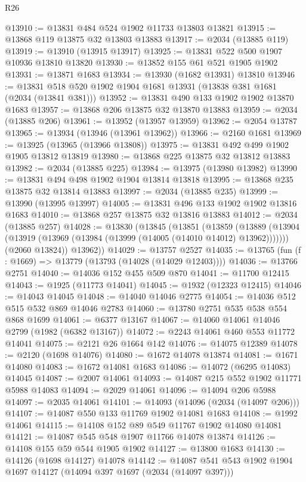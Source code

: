 \begin{lexlean}{R26}
\begin{coremodule}
@13910 := @13831 @484 @524 @1902 @11733 @13803 @13821
@13915 := @13868 @119 @13875 @32 @13803 @13883
@13917 := @2034 (@13885 @119)
@13919 := @13910 (@13915 @13917)
@13925 := @13831 @522 @500 @1907 @10936 @13810 @13820
@13930 := @13852 @155 @61 @521 @1905 @1902
@13931 := @13871 @1683
@13934 := @13930 (@1682 @13931) @13810
@13946 := @13831 @518 @520 @1902 @1904 @1681 @13931 (@13838 @381 @1681 (@2034 (@13841 @381)))
@13952 := @13831 @490 @133 @1902 @1902 @13870 @1683
@13957 := @13868 @206 @13875 @32 @13870 @13883
@13959 := @2034 (@13885 @206)
@13961 := @13952 (@13957 @13959)
@13962 := @2054 @13787
@13965 := @13934 (@13946 (@13961 @13962))
@13966 := @2160 @1681
@13969 := @13925 (@13965 (@13966 @13808))
@13975 := @13831 @492 @499 @1902 @1905 @13812 @13819
@13980 := @13868 @225 @13875 @32 @13812 @13883
@13982 := @2034 (@13885 @225)
@13984 := @13975 (@13980 @13982)
@13990 := @13831 @494 @498 @1902 @1904 @13814 @13818
@13995 := @13868 @235 @13875 @32 @13814 @13883
@13997 := @2034 (@13885 @235)
@13999 := @13990 (@13995 @13997)
@14005 := @13831 @496 @133 @1902 @1902 @13816 @1683
@14010 := @13868 @257 @13875 @32 @13816 @13883
@14012 := @2034 (@13885 @257)
@14028 := @13830
    (@13845
      (@13851
        (@13859
          (@13889 (@13904 (@13919 (@13969 (@13984 (@13999 (@14005 (@14010 @14012) @13962)))))))
          (@2060 @13824))
        @13962))
@14029 := @13757 @2527
@14035 := @13765 (fun (f : @1669) => @13779 (@13793 (@14028 (@14029 @12403))))
@14036 := @13766 @2751
@14040 := @14036 @152 @455 @509 @870
@14041 := @11700 @12415
@14043 := @1925 (@11773 @14041)
@14045 := @1932 (@12323 @12415)
@14046 := @14043 @14045
@14048 := @14040 @14046 @2775
@14054 := @14036 @512 @515 @532 @869 @14046 @2783
@14060 := @13780 @2751 @535 @538 @554 @868 @1699
@14061 := @6377 @13167
@14067 := @14060 @14061 @14046 @2799 (@1982 (@6382 @13167))
@14072 := @2243 @14061 @460 @553 @11772 @14041
@14075 := @2121 @26 @1664 @142
@14076 := @14075 @12389
@14078 := @2120 (@1698 @14076)
@14080 := @1672 @14078 @13874
@14081 := @1671 @14080
@14083 := @1672 @14081 @1683
@14086 := @14072 (@6295 @14083) @14045
@14087 := @2007 @14061
@14093 := @14087 @215 @552 @1902 @11771 @5988 @14083
@14094 := @2029 @14061
@14096 := @14094 @206 @5988
@14097 := @2035 @14061
@14101 := @14093 (@14096 (@2034 (@14097 @206)))
@14107 := @14087 @550 @133 @11769 @1902 @14081 @1683
@14108 := @1992 @14061
@14115 := @14108 @152 @89 @549 @11767 @1902 @14080 @14081
@14121 := @14087 @545 @548 @1907 @11766 @14078 @13874
@14126 := @14108 @155 @59 @544 @1905 @1902
@14127 := @13800 @1683
@14130 := @14126 (@1698 @14127) @14078
@14142 := @14087 @541 @543 @1902 @1904 @1697 @14127 (@14094 @397 @1697 (@2034 (@14097 @397)))

\end{coremodule}
\end{lexlean}
